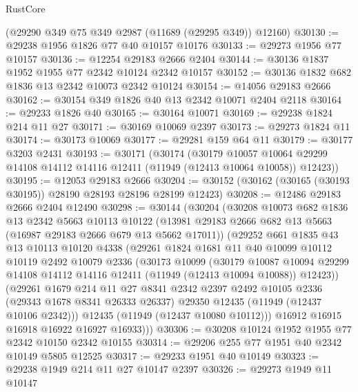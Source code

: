 \begin{lexlean}{RustCore}
\begin{coremodule}
    (@29290 @349 @75 @349 @2987 (@11689 (@29295 @349)) @12160)
@30130 := @29238 @1956 @1826 @77 @40 @10157 @10176
@30133 := @29273 @1956 @77 @10157
@30136 := @12254 @29183 @2666 @2404
@30144 := @30136 @1837 @1952 @1955 @77 @2342 @10124 @2342 @10157
@30152 := @30136 @1832 @682 @1836 @13 @2342 @10073 @2342 @10124
@30154 := @14056 @29183 @2666
@30162 := @30154 @349 @1826 @40 @13 @2342 @10071 @2404 @2118
@30164 := @29233 @1826 @40
@30165 := @30164 @10071
@30169 := @29238 @1824 @214 @11 @27
@30171 := @30169 @10069 @2397
@30173 := @29273 @1824 @11
@30174 := @30173 @10069
@30177 := @29281 @159 @64 @11
@30179 := @30177 @3203 @2431
@30193 := @30171
    (@30174
      (@30179
        @10057
        @10064
        @29299
        @14108
        @14112
        @14116
        @12411
        (@11949 (@12413 @10064 @10058))
        @12423))
@30195 := @12053 @29183 @2666
@30204 := @30152 (@30162 (@30165 (@30193 @30195)) @28190 @28193 @28196 @28199 @12423)
@30208 := @12486 @29183 @2666 @2404 @12490
@30298 := @30144
    (@30204
      (@30208
        @10073
        @682
        @1836
        @13
        @2342
        @5663
        @10113
        @10122
        (@13981 @29183 @2666 @682 @13 @5663 (@16987 @29183 @2666 @679 @13 @5662 @17011))
        (@29252
          @661
          @1835
          @43
          @13
          @10113
          @10120
          @4338
          (@29261
            @1824
            @1681
            @11
            @40
            @10099
            @10112
            @10119
            @2492
            @10079
            @2336
            (@30173
              @10099
              (@30179
                @10087
                @10094
                @29299
                @14108
                @14112
                @14116
                @12411
                (@11949 (@12413 @10094 @10088))
                @12423))
            (@29261
              @1679
              @214
              @11
              @27
              @8341
              @2342
              @2397
              @2492
              @10105
              @2336
              (@29343 @1678 @8341 @26333 @26337)
              @29350
              @12435
              (@11949 (@12437 @10106 @2342)))
            @12435
            (@11949 (@12437 @10080 @10112)))
          @16912
          @16915
          @16918
          @16922
          @16927
          @16933)))
@30306 := @30208 @10124 @1952 @1955 @77 @2342 @10150 @2342 @10155
@30314 := @29206 @255 @77 @1951 @40 @2342 @10149 @5805 @12525
@30317 := @29233 @1951 @40 @10149
@30323 := @29238 @1949 @214 @11 @27 @10147 @2397
@30326 := @29273 @1949 @11 @10147

\end{coremodule}
\end{lexlean}
